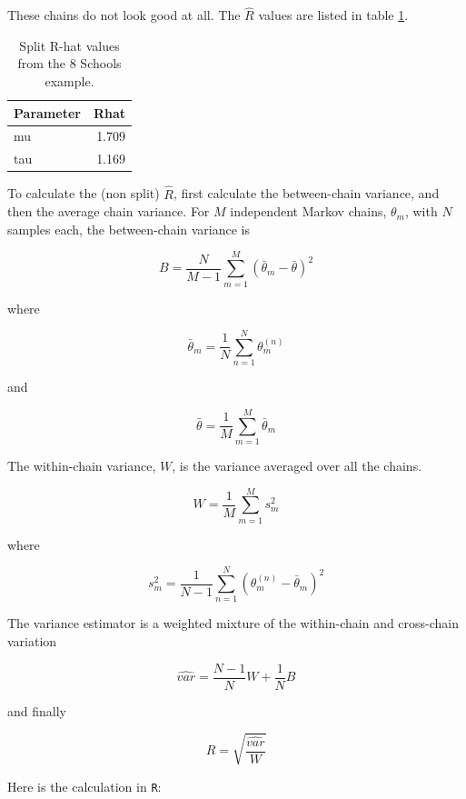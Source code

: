 \documentclass[11pt, oneside, openany]{scrbook}
\begin{document}
These chains do not look good at all. The \(\hat{R}\) values are listed in table \ref{tab:ch030-Ninth-Finger}.

\begin{table}[!h]

\caption{\label{tab:ch030-Ninth-Finger}Split R-hat values from the 8 Schools example.}
\centering
\begin{tabular}[t]{lr}
\toprule
Parameter & Rhat\\
\midrule
mu & 1.709\\
tau & 1.169\\
\bottomrule
\end{tabular}
\end{table}

To calculate the (non split) \(\hat{R}\), first calculate the between-chain variance, and then the average chain variance. For \(M\) independent Markov chains, \(\theta_m\), with \(N\) samples each, the between-chain variance is

\[
B = \frac{N}{M-1}\sum_{m=1}^{M}\left(\bar{\theta}_m - \bar{\theta}\right)^2
\]

where

\[
\bar{\theta}_m = \frac{1}{N}\sum_{n=1}^{N}\theta_{m}^{(n)}
\]

and

\[
\bar{\theta} = \frac{1}{M}\sum_{m=1}^{M}\bar{\theta}_m
\]

The within-chain variance, \(W\), is the variance averaged over all the chains.

\[
W = \frac{1}{M}\sum_{m=1}^{M} s_{m}^2
\]

where

\[
s_{m}^2 = \frac{1}{N-1}\sum_{n=1}^{N}\left(\theta_{m}^{(n)} - \bar{\theta}_m\right)^2
\]

The variance estimator is a weighted mixture of the within-chain and cross-chain variation

\[
\hat{var} = \frac{N-1}{N} W + \frac{1}{N} B
\]

and finally

\[
\hat{R} = \sqrt{\frac{\hat{var}}{W}}
\]

Here is the calculation in \texttt{R}:
\end{document}
